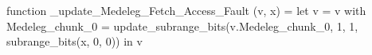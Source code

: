 function _update_Medeleg_Fetch_Access_Fault (v, x) = let v = { v with Medeleg_chunk_0 = update_subrange_bits(v.Medeleg_chunk_0, 1, 1, subrange_bits(x, 0, 0)) } in
  v
